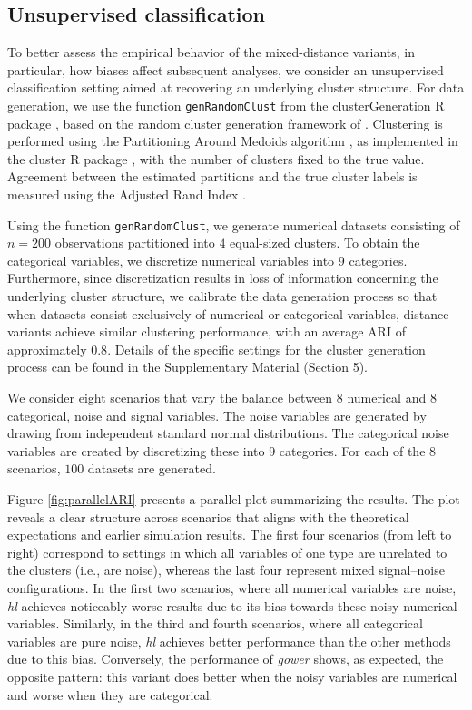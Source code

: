 \documentclass[12pt]{article}
\newcommand{\pkg}[1]{{\normalfont\fontseries{b}\selectfont #1}}
\let\proglang=\textsf
\let\code=\texttt
\begin{document}
\subsection{Unsupervised classification}
To better assess the empirical behavior of the mixed-distance variants, in particular, how biases affect subsequent analyses, we consider an unsupervised classification setting aimed at recovering an underlying cluster structure. For data generation, we use the function \code{genRandomClust} from the \pkg{clusterGeneration} \proglang{R} package \parencite{QiuJoe2023}, based on the random cluster generation framework of \textcite{QiuJoe2006a}. Clustering is performed using the Partitioning Around Medoids algorithm \parencite[PAM,][]{KaufmanRousseeuw1990}, as implemented in the \pkg{cluster} \proglang{R} package \parencite{cluster_pkg}, with the number of clusters fixed to the true value. Agreement between the estimated partitions and the true cluster labels is measured using the Adjusted Rand Index \parencite[ARI,][]{HA:1985}.

Using the function \code{genRandomClust}, we generate numerical datasets consisting of $n=200$ observations partitioned into $4$ equal-sized clusters. To obtain the categorical variables, we discretize numerical variables into $9$ categories. Furthermore, since discretization results in loss of information concerning the underlying cluster structure, we calibrate the data generation process so that when datasets consist exclusively of numerical or categorical variables, distance variants achieve similar clustering performance, with an average ARI of approximately $0.8$. Details of the specific settings for the cluster generation process can be found in the Supplementary Material (Section 5).

We consider eight scenarios that vary the balance between $8$ numerical and $8$ categorical, noise and signal variables. The noise variables are generated by drawing from independent standard normal distributions. The categorical noise variables are created by discretizing these into $9$ categories. For each of the $8$ scenarios, $100$ datasets are generated.

Figure \ref{fig:parallelARI} presents a parallel plot summarizing the results. The plot reveals a clear structure across scenarios that aligns with the theoretical expectations and earlier simulation results. The first four scenarios (from left to right) correspond to settings in which all variables of one type are unrelated to the clusters (i.e., are noise), whereas the last four represent mixed signal–noise configurations. In the first two scenarios, where all numerical variables are noise, \emph{hl} achieves noticeably worse results due to its bias towards these noisy numerical variables. Similarly, in the third and fourth scenarios, where all categorical variables are pure noise, \emph{hl} achieves better performance than the other methods due to this bias. Conversely, the performance of \emph{gower} shows, as expected, the opposite pattern: this variant does better when the noisy variables are numerical and worse when they are categorical.
\end{document}
